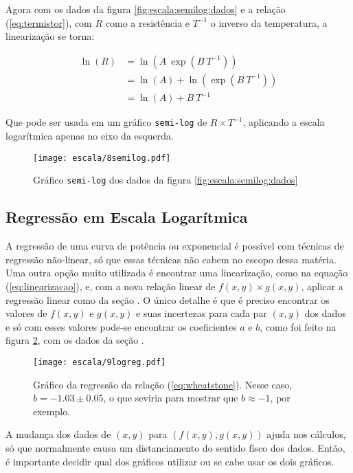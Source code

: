     Agora com os dados da figura \ref{fig:escala:semilog:dados} e a relação (\ref{eq:termistor}), com $R$ como a resistência e $T^{-1}$ o inverso da temperatura, a linearização se torna:

    \begin{align*}
        \ln(R)
            &= \ln\left(A ~ \exp\left(B ~ T^{-1}\right) \right) \\
            &= \ln(A) + \ln\left(\exp\left(B ~ T^{-1}\right) \right) \\
            &= \ln(A) + B ~ T^{-1}
    \end{align*}

    Que pode ser usada em um gráfico \texttt{semi-log} de $R \times T^{-1}$, aplicando a escala logarítmica apenas no eixo da esquerda.

    \begin{figure}[htbp]
        \centering
        \texttt{[image: escala/8semilog.pdf]}

        \caption{Gráfico \texttt{semi-log} dos dados da figura \ref{fig:escala:semilog:dados}}
        \label{fig:escala:semilog:resultado}
    \end{figure}


\subsection{Regressão em Escala Logarítmica}

    A regressão de uma curva de potência ou exponencial é possível com técnicas de regressão não-linear, só que essas técnicas não cabem no escopo dessa matéria. Uma outra opção muito utilizada é encontrar uma linearização, como na equação (\ref{eq:linearizacao}), e, com a nova relação linear de $f(x, y) \times g(x, y)$, aplicar a regressão linear como da seção . O único detalhe é que é preciso encontrar os valores de $f(x, y)$ e $g(x, y)$ e suas incertezas para cada par $(x, y)$ dos dados e só com esses valores pode-se encontrar os coeficientes $a$ e $b$, como foi feito na figura \ref{fig:escala:regres}, com os dados da seção .

    \begin{figure}[htbp]
        \centering
        \texttt{[image: escala/9logreg.pdf]}

        \caption{Gráfico da regressão da relação (\ref{eq:wheatstone}). Nesse caso, $b = -1.03 \pm 0.05$, o que seviria para mostrar que $b \approx -1$, por exemplo.}
        \label{fig:escala:regres}
    \end{figure}

    A mudança dos dados de $(x, y)$ para $(f(x, y), g(x, y))$ ajuda nos cálculos, só que normalmente causa um distanciamento do sentido físco dos dados. Então, é importante decidir qual dos gráficos utilizar ou se cabe usar os dois gráficos.
